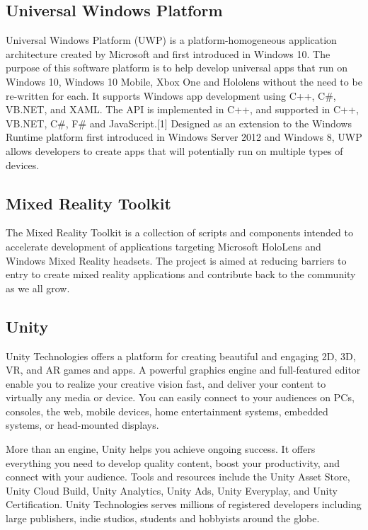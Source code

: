     \subsection{Universal Windows Platform}
    Universal Windows Platform (UWP) is a platform-homogeneous application architecture created by Microsoft and first introduced in Windows 10. The purpose of this software platform is to help develop universal apps that run on Windows 10, Windows 10 Mobile, Xbox One and Hololens without the need to be re-written for each. It supports Windows app development using C++, C\#, VB.NET, and XAML. The API is implemented in C++, and supported in C++, VB.NET, C\#, F\# and JavaScript.[1] Designed as an extension to the Windows Runtime platform first introduced in Windows Server 2012 and Windows 8, UWP allows developers to create apps that will potentially run on multiple types of devices. %
    
    \subsection{Mixed Reality Toolkit}
    The Mixed Reality Toolkit is a collection of scripts and components intended to accelerate development of applications targeting Microsoft HoloLens and Windows Mixed Reality headsets. The project is aimed at reducing barriers to entry to create mixed reality applications and contribute back to the community as we all grow. %

    \subsection{Unity}
    Unity Technologies offers a platform for creating beautiful and engaging 2D, 3D, VR, and AR games and apps. A powerful graphics engine and full-featured editor enable you to realize your creative vision fast, and deliver your content to virtually any media or device. You can easily connect to your audiences on PCs, consoles, the web, mobile devices, home entertainment systems, embedded systems, or head-mounted displays.

    More than an engine, Unity helps you achieve ongoing success. It offers everything you need to develop quality content, boost your productivity, and connect with your audience. Tools and resources include the Unity Asset Store, Unity Cloud Build, Unity Analytics, Unity Ads, Unity Everyplay, and Unity Certification. Unity Technologies serves millions of registered developers including large publishers, indie studios, students and hobbyists around the globe.
    
